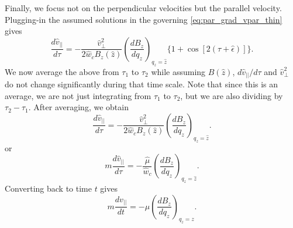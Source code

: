 \documentclass[a4paper,11pt]{report}
\begin{document}
Finally, we focus not on the perpendicular velocities but the parallel velocity. Plugging-in the assumed solutions in the governing \cref{eq:par_grad_vpar_thin} gives
\begin{equation}
    \frac{d\hat{v}_{||}}{d\tau} = -\frac{\hat{v}^2_{\perp}}{2\hat{w}_c B_z(\hat{z})} \left ( \frac{dB_z}{dq_z} \right )_{q_z = \hat{z}} \{ 1 + \cos [2(\tau + \hat{\epsilon})] \}.
\end{equation}
We now average the above from $\tau_1$ to $\tau_2$ while assuming $B(\hat{z})$, $d\hat{v}_{||}/d\tau$ and $\hat{v}^2_\perp$ do not change significantly during that time scale. Note that since this is an average, we are not just integrating from $\tau_1$ to $\tau_2$, but we are also dividing by $\tau_2 - \tau_1$. After  averaging, we obtain
\begin{equation}
    \frac{d\hat{v}_{||}}{d\tau} = -\frac{\hat{v}^2_{\perp}}{2\hat{w}_c B_z(\hat{z})} \left ( \frac{dB_z}{dq_z} \right )_{q_z = \hat{z}} .
\end{equation}
or
\begin{equation}
    m \frac{d\hat{v}_{||}}{d\tau} = -\frac{\hat{\mu}}{\hat{w}_c} \left ( \frac{dB_z}{dq_z} \right )_{q_z = \hat{z}} .
\end{equation}
Converting back to time $t$ gives
\begin{equation}
    m \frac{dv_{||}}{dt} = -\mu \left ( \frac{dB_z}{dq_z} \right )_{q_z = z} .
\end{equation}


\end{document}
